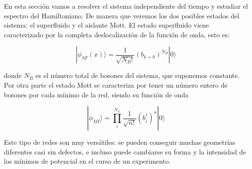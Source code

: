 \documentclass[11pt,a4paper]{article}
\begin{document}
En esta sección vamos a resolver el sistema independiente del tiempo y estudiar el espectro del Hamiltoniano. De manera que veremos los dos posibles estados del sistema: el superfluido y el aislante Mott. El estado superfluido viene caracterizado por la completa deslocalización de la función de onda, esto es:

\begin{equation}
  |\phi_{SF}(x)\rangle=\frac{1}{\sqrt{N_B!}}(b_{k=0})^{N_B}|0\rangle
\end{equation}

donde $N_B$ es el número total de bosones del sistema, que suponemos constante. Por otra parte el estado Mott se caracteriza por tener un número entero de bosones por cada mínimo de la red, siendo su función de onda

\begin{equation}
  |\phi_{MI}\rangle=\prod_i^{N_L}\frac{1}{\sqrt{n!}}(b_i^{\dagger})^n|0\rangle
\end{equation}



\begin{figure} [h]
 \centering
  \caption{}
 \label{f:comparacion}
\end{figure}


 
Este tipo de redes son muy versátiles: se pueden conseguir muchas geometrías diferentes casi sin defectos, e incluso puede cambiarse su forma y la intensidad de los mínimos de potencial en el curso de un experimento. 
\end{document}
